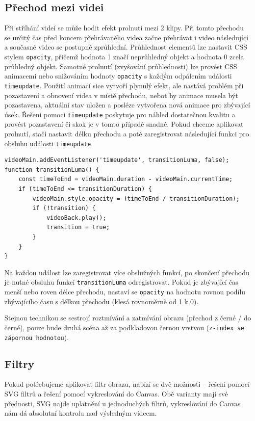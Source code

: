 \subsection{Přechod mezi videi}
Při stříhání videí se může hodit efekt prolnutí mezi 2 klipy. Při tomto přechodu se určitý čas před koncem přehrávaného videa začne přehrávat i video následující a současné video se postupně zprůhlední. Průhlednost elementů lze nastavit CSS stylem \texttt{opacity}, přičemž hodnota 1 značí neprůhledný objekt a hodnota 0 zcela průhledný objekt. Samotné prolnutí (zvyšování průhlednosti) lze provést CSS animacemi nebo snižováním hodnoty \texttt{opacity} s každým odpálením události \texttt{timeupdate}. Použití animací sice vytvoří plynulý efekt, ale nastává problém při pozastavení a obnovení videa v místě přechodu, neboť by animace musela být pozastavena, aktuální stav uložen a posléze vytvořena nová animace pro zbývající úsek. Řešení pomocí \texttt{timeupdate} poskytuje pro náhled dostatečnou kvalitu a provést pozastavení či skok je v tomto případě snadné. Pokud chceme aplikovat prolnutí, stačí nastavit délku přechodu a poté zaregistrovat následující funkci pro obsluhu události \texttt{timeupdate}.
\begin{lstlisting}[style=JavaScript]
videoMain.addEventListener('timeupdate', transitionLuma, false);
function transitionLuma() {
    const timeToEnd = videoMain.duration - videoMain.currentTime;
    if (timeToEnd <= transitionDuration) {
        videoMain.style.opacity = (timeToEnd / transitionDuration);
        if (!transition) {
            videoBack.play();
            transition = true;
        }
    }
}
\end{lstlisting}
Na každou událost lze zaregistrovat více obslužných funkcí, po skončení přechodu je nutné obsluhu funkcí \texttt{transitionLuma} odregistrovat. Pokud je zbývající čas menší nebo roven délce přechodu, nastaví se \texttt{opacity} na hodnotu rovnou podílu zbývajícího času s délkou přechodu (klesá rovnoměrně od 1 k 0).

Stejnou technikou se sestrojí roztmívání a zatmívání obrazu (přechod z černé / do černé), pouze bude druhá scéna až za podkladovou černou vrstvou (\texttt{z-index se zápornou hodnotou}).

\subsection{Filtry}
Pokud potřebujeme aplikovat filtr obrazu, nabízí se dvě možnosti -- řešení pomocí SVG filtrů a řešení pomocí vykreslování do Canvas. Obě varianty mají své přednosti, SVG najde uplatnění u jednoduchých filtrů, vykreslování do Canvas nám dá absolutní kontrolu nad výsledným videem.

